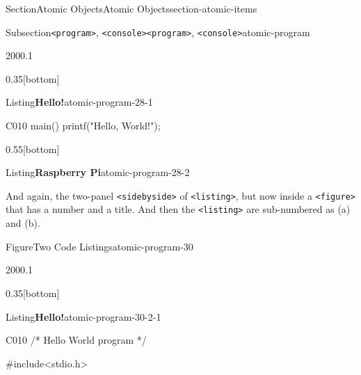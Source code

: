 \documentclass[twoside,10pt,]{article}
\newcommand{\mono}[1]{\texttt{#1}}
\numberwithin{equation}{section}
\newcommand{\consoleinput}[1]{\textbf{#1}}
\begin{document}
\begin{sectionptx}{Section}{Atomic Objects}{}{Atomic Objects}{}{}{section-atomic-items}
\begin{subsectionptx}{Subsection}{\mono{<program>}, \mono{<console>}}{}{\mono{<program>}, \mono{<console>}}{}{}{atomic-program}
\begin{sidebyside}{2}{0}{0}{0.1}
\begin{sbspanel}{0.35}[bottom]
\begin{panellistingptx}{Listing}{\textbf{Hello!}}{atomic-program-28-1}{}
\begin{program}{C}{0}{1}{0}
main()
{
    printf("Hello, World!");
}
\end{program}
\tcblower
\end{panellistingptx}%
\end{sbspanel}%
\begin{sbspanel}{0.55}[bottom]%
\begin{panellistingptx}{Listing}{\textbf{Raspberry Pi}}{atomic-program-28-2}{}%
\tcblower
\end{panellistingptx}%
\end{sbspanel}%
\end{sidebyside}%
\par
And again, the two-panel \mono{<sidebyside>} of \mono{<listing>}, but now inside a \mono{<figure>} that has a number and a title.  And then the \mono{<listing>} are sub-numbered as (a) and (b).%
\begin{figureptx}{Figure}{Two Code Listings}{atomic-program-30}{}%
\begin{sidebyside}{2}{0}{0}{0.1}%
\begin{sbspanel}{0.35}[bottom]%
\begin{sublistingptx}{Listing}{\textbf{Hello!}}{atomic-program-30-2-1}{}%
\begin{program}{C}{0}{1}{0}
/* Hello World program */

#include<stdio.h>


\end{program}
\end{sublistingptx}
\end{sbspanel}
\end{sidebyside}
\end{figureptx}
\end{subsectionptx}
\end{sectionptx}
\end{document}
